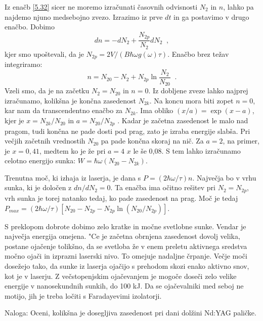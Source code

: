 Iz enačb \ref{5.32} sicer ne moremo izračunati časovnih odvisnosti $%
N_{2}$ in $n$, lahko pa najdemo njuno medsebojno zvezo. Izrazimo iz prve $dt$
in ga postavimo v drugo enačbo. Dobimo 
\begin{equation}
dn=-dN_{2}+\frac{N_{2p}}{N_{2}}dN_{2}\;\;,  \label{5.341}
\end{equation}
kjer smo upoštevali, da je $N_{2p}=2V/(B\hbar \omega g(\omega )\tau )$.
Enačbo brez težav integriramo: 
\begin{equation}
n=N_{20}-N_{2}+N_{2p}\ln \frac{N_{2}}{N_{20}}\;\;.  \label{5.351}
\end{equation}
Vzeli smo, da je na začetku $N_{2}=N_{20}$ in $n=0$. Iz dobljene zveze
lahko najprej izračunamo, kolikšna je končna zasedenost $N_{2k}$. Na
koncu mora biti zopet $n=0$, kar nam da transcendentno enačbo za $N_{2k}$.
Ima obliko $(x/a)=\exp (x-a)$, kjer je $x=N_{2k}/N_{20}$ in $a=N_{20}/N_{2p}$%
. Kadar je začetna zasedenost le malo nad pragom, tudi končna ne pade
dosti pod prag, zato je izraba energije slabša. Pri večjih začetnih
vrednostih $N_{20}$ pa pade končna skoraj na nič. Za $a=2$, na primer,
je $x=0,41$, medtem ko je že pri $a=4$ $x$ le še 0,08. S tem lahko
izračunamo celotno energijo sunka: $W=\hbar \omega (N_{20}-N_{2k})$.

Trenutna moč, ki izhaja iz laserja, je dana s $P=(2\hbar \omega /\tau )n$.
Največja bo v vrhu sunka, ki je določen z $dn/dN_{2}=0$. Ta enačba ima
očitno rešitev pri $N_{2}=N_{2p}$, vrh sunka je torej natanko tedaj, ko
pade zasedenost na prag. Moč je tedaj $P_{max}=(2\hbar \omega /\tau
)[N_{20}-N_{2p}-N_{2p}\ln (N_{20}/N_{2p})]$.

S preklopom dobrote dobimo zelo kratke in močne svetlobne sunke. Vendar je
največja energija omejena. "Ce je začetna obrnjena zasedenost dovolj
velika, postane ojačenje tolikšno, da se svetloba že v enem preletu
aktivnega sredstva močno ojači in izprazni laserski nivo. To omejuje
nadaljne črpanje. Večje moči dosežejo tako, da sunke iz laserja ojačijo
s prehodom skozi enako aktivno snov, kot je v laserju. Z večstopenjskim
ojačevanjem je mogoče doseči zelo velike energije v nanosekundnih sunkih,
do 100 kJ. Da se ojačevalniki med seboj ne motijo, jih je treba ločiti s
Faradayevimi izolatorji.

Naloga: Oceni, kolikšna je dosegljiva zasedenost pri dani dolžini Nd:YAG
paličke.

